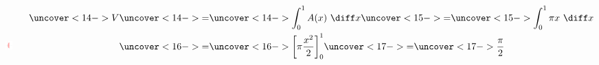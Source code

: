 \begin{frame}
\begin{example}[Example 2, p. 440]
\begin{columns}[c]
\begin{center}
{\includegraphics[height=3.5cm]{volumes/pictures/06-02-ex2d.pdf} %
}%
%
%
%
\end{center}
\abovedisplayskip=0pt
\belowdisplayskip=0pt
\abovedisplayshortskip=0pt
\belowdisplayshortskip=0pt
\begin{align*}
\uncover<14->{%
V%
}%
& \uncover<14->{ = } %
\uncover<14->{%
\int_0^1 A(x) \ \diff x%
}%
 \uncover<15->{ = } %
\uncover<15->{%
\int_0^1 \pi x \ \diff x%
}\\%
& \uncover<16->{ = } %
\uncover<16->{%
\left[ \pi \frac{x^2}{2}\right]_0^1%
}%
 \uncover<17->{ = } %
\uncover<17->{%
\frac{\pi}{2}%
}%
\end{align*}
\end{columns}
\end{example}
\end{frame}
